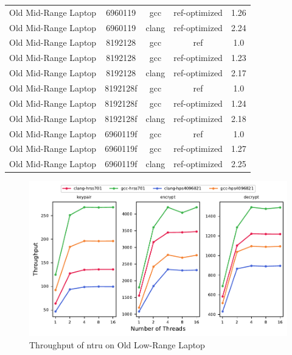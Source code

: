 \begin{table}
\begin{tabularx}{\linewidth}{X c c c c}
        Old Mid-Range Laptop &              6960119 &                  gcc &        ref-optimized &                1.26\\
        Old Mid-Range Laptop &              6960119 &                clang &        ref-optimized &                2.24\\
        Old Mid-Range Laptop &              8192128 &                  gcc &                  ref &                  1.0\\
        Old Mid-Range Laptop &              8192128 &                  gcc &        ref-optimized &                1.23\\
        Old Mid-Range Laptop &              8192128 &                clang &        ref-optimized &                2.17\\
        Old Mid-Range Laptop &             8192128f &                  gcc &                  ref &                  1.0\\
        Old Mid-Range Laptop &             8192128f &                  gcc &        ref-optimized &                1.24\\
        Old Mid-Range Laptop &             8192128f &                clang &        ref-optimized &                2.18\\
        Old Mid-Range Laptop &             6960119f &                  gcc &                  ref &                  1.0\\
        Old Mid-Range Laptop &             6960119f &                  gcc &        ref-optimized &                1.27\\
        Old Mid-Range Laptop &             6960119f &                clang &        ref-optimized &                2.25\\
        \bottomrule
    \end{tabularx}
\end{table}

\begin{figure}
    \centering
    \includegraphics[scale=0.75]{chapters/results/throughput/Old Low-Range Laptop_ntru.pdf}
    \caption{Throughput of \gls{ntru} on Old Low-Range Laptop}
    \label{figure:results:throughput:ntru:old-low-range-laptop}
\end{figure}

